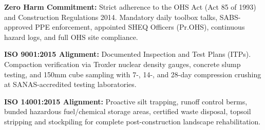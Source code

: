 \hypertarget{sec:sheq}{}

\noindent
\begin{minipage}[t]{0.31\textwidth}
    \begin{tcolorbox}[
        enhanced, colback=white, colframe=mhlightgray, boxrule=0.8pt, arc=4pt,
        title={\bfseries\color{white}\faShieldAlt\ Occupational Health \& Safety},
        colbacktitle=mhnavy, fonttitle=\bfseries\small,
        left=8pt, right=8pt, top=8pt, bottom=8pt, height=6.3cm,
        drop shadow=black!4
    ]
        {\fontsize{8.4pt}{11.8pt}\selectfont\color{mhtext}
        \textbf{Zero Harm Commitment:} Strict adherence to the OHS Act (Act 85 of 1993) and Construction Regulations 2014. Mandatory daily toolbox talks, SABS-approved PPE enforcement, appointed SHEQ Officers (Pr.OHS), continuous hazard logs, and full OHS site compliance.
        }
    \end{tcolorbox}
\end{minipage}
\hfill
\begin{minipage}[t]{0.31\textwidth}
    \begin{tcolorbox}[
        enhanced, colback=white, colframe=mhlightgray, boxrule=0.8pt, arc=4pt,
        title={\bfseries\color{white}\faCheckDouble\ Quality Assurance \& Testing},
        colbacktitle=mhblue, fonttitle=\bfseries\small,
        left=8pt, right=8pt, top=8pt, bottom=8pt, height=6.3cm,
        drop shadow=black!4
    ]
        {\fontsize{8.4pt}{11.8pt}\selectfont\color{mhtext}
        \textbf{ISO 9001:2015 Alignment:} Documented Inspection and Test Plans (ITPs). Compaction verification via Troxler nuclear density gauges, concrete slump testing, and 150mm cube sampling with 7-, 14-, and 28-day compression crushing at SANAS-accredited testing laboratories.
        }
    \end{tcolorbox}
\end{minipage}
\hfill
\begin{minipage}[t]{0.31\textwidth}
    \begin{tcolorbox}[
        enhanced, colback=white, colframe=mhlightgray, boxrule=0.8pt, arc=4pt,
        title={\bfseries\color{white}\faLeaf\ Environmental Management},
        colbacktitle=mhbluebright, fonttitle=\bfseries\small,
        left=8pt, right=8pt, top=8pt, bottom=8pt, height=6.3cm,
        drop shadow=black!4
    ]
        {\fontsize{8.4pt}{11.8pt}\selectfont\color{mhtext}
        \textbf{ISO 14001:2015 Alignment:} Proactive silt trapping, runoff control berms, bunded hazardous fuel/chemical storage areas, certified waste disposal, topsoil stripping and stockpiling for complete post-construction landscape rehabilitation.
        }
    \end{tcolorbox}
\end{minipage}

